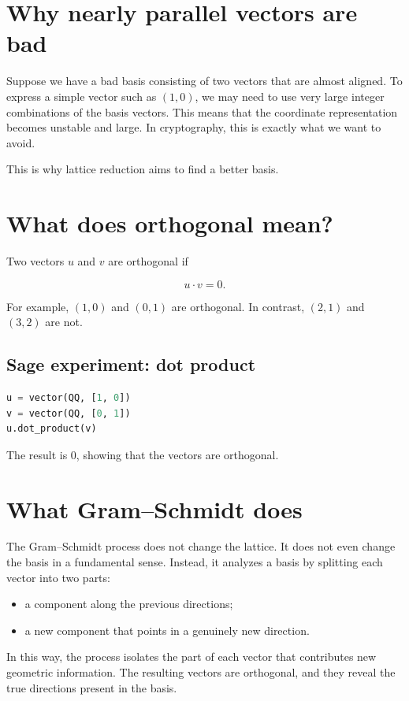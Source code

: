 \section{Why nearly parallel vectors are bad}
Suppose we have a bad basis consisting of two vectors that are almost aligned. To express a simple vector such as $(1,0)$, we may need to use very large integer combinations of the basis vectors. This means that the coordinate representation becomes unstable and large. In cryptography, this is exactly what we want to avoid.

This is why lattice reduction aims to find a better basis.

\section{What does orthogonal mean?}
Two vectors $u$ and $v$ are orthogonal if

\[
u \cdot v = 0.
\]

For example, $(1,0)$ and $(0,1)$ are orthogonal. In contrast, $(2,1)$ and $(3,2)$ are not.

\subsection{Sage experiment: dot product}

\begin{lstlisting}[language=Python]
u = vector(QQ, [1, 0])
v = vector(QQ, [0, 1])
u.dot_product(v)
\end{lstlisting}

The result is $0$, showing that the vectors are orthogonal.

\section{What Gram--Schmidt does}
The Gram--Schmidt process does not change the lattice. It does not even change the basis in a fundamental sense. Instead, it analyzes a basis by splitting each vector into two parts:

\begin{itemize}
  \item a component along the previous directions;
  \item a new component that points in a genuinely new direction.
\end{itemize}

In this way, the process isolates the part of each vector that contributes new geometric information. The resulting vectors are orthogonal, and they reveal the true directions present in the basis.

